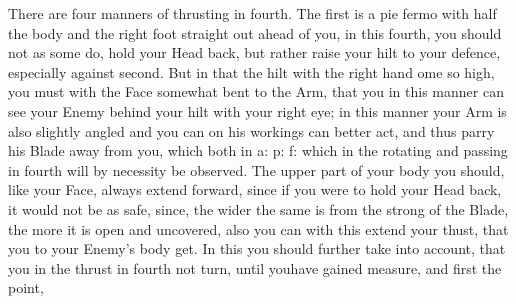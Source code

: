There are four manners of thrusting in fourth. The first is a pie
fermo with half the body and the right foot straight out ahead of you,
in this fourth, you should not as some do, hold your Head back, but
rather raise your hilt to your defence, especially against second. But
in that the hilt with the right hand ome so high, you must with the
Face somewhat bent to the Arm,
that you in this manner can see your Enemy behind your hilt with your
right eye; in this manner your Arm is also slightly angled  and you
can on his workings can better act, and thus parry his Blade away from
you, which both in a: p: f: which in the rotating and passing in
fourth will by necessity be observed.
The upper part of your body you should, like your Face, always extend
forward, since if you were to hold your Head back, it would not be as
safe, since, the wider the same is from the strong of the Blade, the
more it is open and uncovered, also you can with this extend your
thust, that you to your Enemy's body get.
In this you should further take into account, that you in the thrust
in fourth not turn, until youhave gained measure, and first the point,
